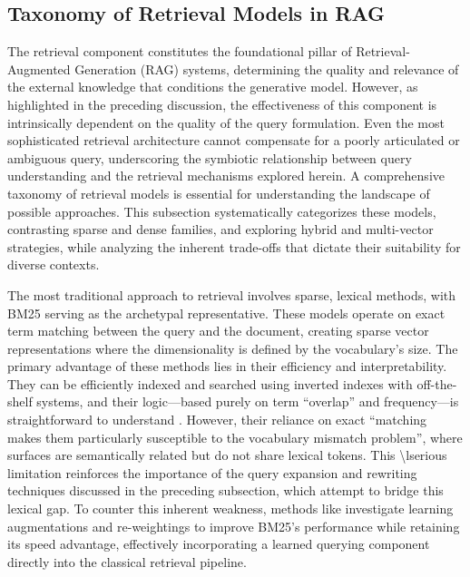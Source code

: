 \documentclass[11pt]{article}
\begin{document}
\subsection{Taxonomy of Retrieval Models in RAG}

The retrieval component constitutes the foundational pillar of Retrieval-Augmented Generation (RAG) systems, determining the quality and relevance of the external knowledge that conditions the generative model. However, as highlighted in the preceding discussion, the effectiveness of this component is intrinsically dependent on the quality of the query formulation. Even the most sophisticated retrieval architecture cannot compensate for a poorly articulated or ambiguous query, underscoring the symbiotic relationship between query understanding and the retrieval mechanisms explored herein. A comprehensive taxonomy of retrieval models is essential for understanding the landscape of possible approaches. This subsection systematically categorizes these models, contrasting sparse and dense families, and exploring hybrid and multi-vector strategies, while analyzing the inherent trade-offs that dictate their suitability for diverse contexts.

The most traditional approach to retrieval involves sparse, lexical methods, with BM25 serving as the archetypal representative. These models operate on exact term matching between the query and the document, creating sparse vector representations where the dimensionality is defined by the vocabulary's size. The primary advantage of these methods lies in their efficiency and interpretability. They can be efficiently indexed and searched using inverted indexes with off-the-shelf systems, and their logic---based purely on term ``overlap'' and frequency---is straightforward to understand \cite{ref74}. However, their reliance on exact ``matching makes them particularly susceptible to the vocabulary mismatch problem'', where surfaces are semantically related but do not share lexical tokens. This \textbackslash lserious limitation reinforces the importance of the query expansion and rewriting techniques discussed in the preceding subsection, which attempt to bridge this lexical gap. To counter this inherent weakness, methods like \cite{ref75} investigate learning augmentations and re-weightings to improve BM25's performance while retaining its speed advantage, effectively incorporating a learned querying component directly into the classical retrieval pipeline.
\end{document}
